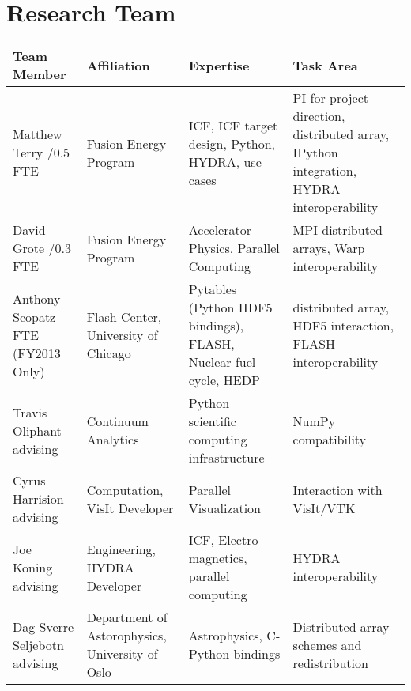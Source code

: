 \documentclass[letterpaper,12pt]{article}
\newlength{\DUtablewidth} %
\begin{document}
\section*{Research Team}

\setlength{\DUtablewidth}{\linewidth}
\begin{longtable*}[c]
	{|p{0.187\DUtablewidth}|p{0.251\DUtablewidth}|p{0.260\DUtablewidth}|p{0.251\DUtablewidth}|}
	\hline
	\textbf{Team Member} & \textbf{Affiliation} & \textbf{Expertise} & \textbf{Task Area} \\
	\endfirsthead
	\hline

	Matthew Terry /0.5 FTE &
	Fusion Energy Program &
	ICF, ICF target design, Python, HYDRA, use cases &
	PI for project direction,
	distributed array, IPython integration, HYDRA interoperability \\
	\hline

	David Grote /0.3 FTE &
	Fusion Energy Program &
	Accelerator Physics, Parallel Computing &
	MPI distributed arrays, Warp interoperability \\
	\hline

	Anthony Scopatz  FTE (FY2013 Only) &
	Flash Center, \newline
	University of Chicago &
	Pytables (Python HDF5 bindings), FLASH, Nuclear fuel cycle, HEDP &
	distributed array, HDF5 interaction, FLASH interoperability \\
	\hline

	Travis Oliphant \newline
	advising &
	Continuum Analytics &
	Python scientific computing infrastructure &
	NumPy compatibility \\
	\hline

	Cyrus Harrision \newline
	advising &
	Computation, \newline
	VisIt Developer &
	Parallel Visualization &
	Interaction with VisIt/VTK  \\
	\hline

	Joe Koning \newline
	advising &
	Engineering, \newline
	HYDRA Developer & 
	ICF, Electro-magnetics, parallel computing & 
	HYDRA interoperability \\
	\hline

	Dag Sverre Seljebotn \newline
	advising &
	Department of Astorophysics, \newline
	University of Oslo &
	Astrophysics, C-Python bindings &
	Distributed array schemes and redistribution \\
	\hline
\end{longtable*}

\newpage



\end{document}
